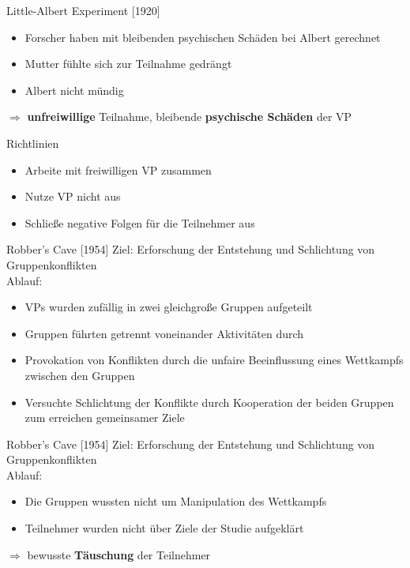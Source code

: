 \documentclass[10pt]{beamer}
\begin{document}
	\begin{frame}{Little-Albert Experiment [1920]}
		
		\begin{itemize}
			\item Forscher haben mit bleibenden psychischen Schäden bei Albert gerechnet
			\item Mutter fühlte sich zur Teilnahme gedrängt
			\item Albert nicht mündig
		\end{itemize}
		$\Rightarrow$ \textbf{unfreiwillige} Teilnahme, bleibende \textbf{psychische Schäden} der VP
	\end{frame}

	
	\begin{frame}{Richtlinien}
		
		\begin{itemize}
			\item Arbeite mit freiwilligen VP zusammen
			\item Nutze VP nicht aus
			\item Schließe negative Folgen für die Teilnehmer aus
		\end{itemize}
		
	\end{frame}
	
	\begin{frame}{Robber's Cave [1954]}
		Ziel: Erforschung der Entstehung und Schlichtung von Gruppenkonflikten\\
		Ablauf:
		\begin{itemize}
			\item VPs wurden zufällig in zwei gleichgroße Gruppen aufgeteilt
			\item Gruppen führten getrennt voneinander Aktivitäten durch
			\item Provokation von Konflikten durch die unfaire Beeinflussung eines Wettkampfs zwischen den Gruppen
			\item Versuchte Schlichtung der Konflikte durch Kooperation der beiden Gruppen zum erreichen gemeinsamer Ziele
		\end{itemize}
		
	\end{frame}	

	\begin{frame}{Robber's Cave [1954]}
		Ziel: Erforschung der Entstehung und Schlichtung von Gruppenkonflikten\\
		Ablauf:
		\begin{itemize}
			\item Die Gruppen wussten nicht um Manipulation des Wettkampfs
			\item Teilnehmer wurden nicht über Ziele der Studie aufgeklärt
		\end{itemize}
		$\Rightarrow$ bewusste \textbf{Täuschung} der Teilnehmer
	\end{frame}	
\end{document}
